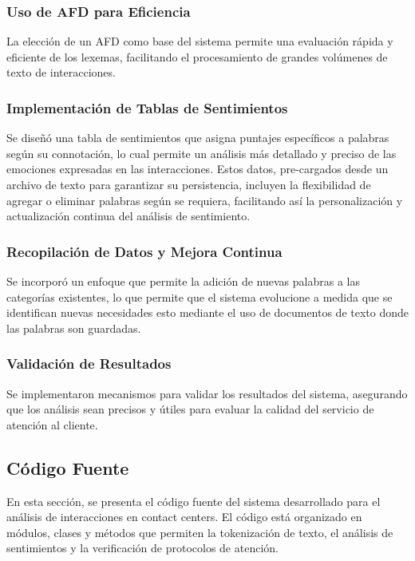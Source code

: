 \documentclass[12pt,a4paper]{article}
\begin{document}
\subsubsection{Uso de AFD para Eficiencia}
La elección de un AFD como base del sistema permite una evaluación rápida y eficiente de los
lexemas, facilitando el procesamiento de grandes volúmenes de texto de interacciones.

\subsubsection{Implementación de Tablas de Sentimientos}
Se diseñó una tabla de sentimientos que asigna puntajes específicos a palabras según su
connotación, lo cual permite un análisis más detallado y preciso de las emociones expresadas en
las interacciones. Estos datos, pre-cargados desde un archivo de texto para garantizar su
persistencia, incluyen la flexibilidad de agregar o eliminar palabras según se requiera,
facilitando así la personalización y actualización continua del análisis de sentimiento.

\subsubsection{Recopilación de Datos y Mejora Continua}
Se incorporó un enfoque que permite la adición de nuevas palabras a las categorías existentes,
lo que permite que el sistema evolucione a medida que se identifican nuevas necesidades esto
mediante el uso de documentos de texto donde las palabras son guardadas.

\subsubsection{Validación de Resultados}
Se implementaron mecanismos para validar los resultados del sistema, asegurando que los
análisis sean precisos y útiles para evaluar la calidad del servicio de atención al cliente.

\newpage

\subsection{Código Fuente}
En esta sección, se presenta el código fuente del sistema desarrollado para el análisis de
interacciones en contact centers. El código está organizado en módulos, clases y métodos que
permiten la tokenización de texto, el análisis de sentimientos y la verificación de protocolos
de atención.
\end{document}
